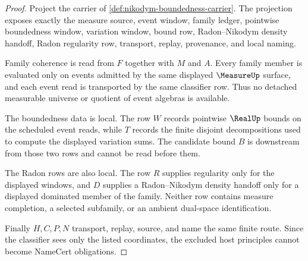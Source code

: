 \begin{proof}
Project the carrier of \autoref{def:nikodym-boundedness-carrier}. The projection exposes exactly the measure source, event window, family ledger, pointwise boundedness window, variation window, bound row, Radon--Nikodym density handoff, Radon regularity row, transport, replay, provenance, and local naming.

Family coherence is read from $F$ together with $M$ and $A$. Every family member is evaluated only on events admitted by the same displayed $\MeasureUp$ surface, and each event read is transported by the same classifier row. Thus no detached measurable universe or quotient of event algebras is available.

The boundedness data is local. The row $W$ records pointwise $\RealUp$ bounds on the scheduled event reads, while $T$ records the finite disjoint decompositions used to compute the displayed variation sums. The candidate bound $B$ is downstream from those two rows and cannot be read before them.

The Radon rows are also local. The row $R$ supplies regularity only for the displayed windows, and $D$ supplies a Radon--Nikodym density handoff only for a displayed dominated member of the family. Neither row contains measure completion, a selected subfamily, or an ambient dual-space identification.

Finally $H,C,P,N$ transport, replay, source, and name the same finite route. Since the classifier sees only the listed coordinates, the excluded host principles cannot become NameCert obligations.
\end{proof}

